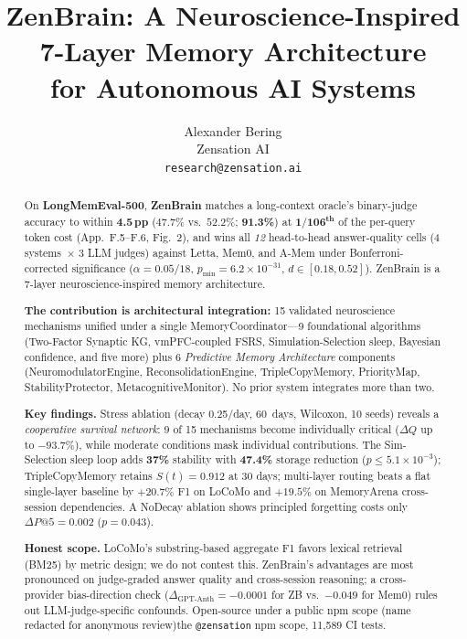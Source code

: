 \documentclass{article}
\title{ZenBrain: A Neuroscience-Inspired 7-Layer Memory Architecture\\for Autonomous AI Systems}
\author{
  Alexander Bering \\
  Zensation AI \\
  \texttt{research@zensation.ai} \\
}
\makeatletter
\newcommand{\anon}[2]{\if@anonymous #2\else #1\fi}
\makeatother
\begin{document}
\maketitle

\begin{abstract}
On \textbf{LongMemEval-500}, \textbf{ZenBrain} matches a long-context
oracle's binary-judge accuracy to within \textbf{4.5\,pp}
($47.7\%$ vs.\ $52.2\%$; \textbf{91.3\%}) at
$\mathbf{1/106^\text{th}}$ of the per-query token cost
(App.~F.5--F.6, Fig.~2), and wins all \emph{12} head-to-head
answer-quality cells (4 systems~$\times$ 3 LLM judges) against
Letta, Mem0, and A-Mem under
Bonferroni-corrected significance ($\alpha{=}0.05/18$,
$p_{\min}{=}6.2\times 10^{-31}$, $d \in [0.18, 0.52]$).
ZenBrain is a 7-layer neuroscience-inspired memory architecture.

\textbf{The contribution is architectural integration:}
15 validated neuroscience mechanisms unified under a single
MemoryCoordinator---9 foundational algorithms (Two-Factor Synaptic KG,
vmPFC-coupled FSRS, Simulation-Selection sleep, Bayesian confidence,
and five more) plus 6 \emph{Predictive Memory Architecture} components
(NeuromodulatorEngine, ReconsolidationEngine, TripleCopyMemory,
PriorityMap, StabilityProtector, MetacognitiveMonitor). No prior
system integrates more than two.

\textbf{Key findings.} Stress ablation (decay 0.25/day, 60~days,
Wilcoxon, 10 seeds) reveals a \emph{cooperative survival network}:
9 of 15 mechanisms become individually critical ($\Delta Q$ up to
$-93.7\%$), while moderate conditions mask individual contributions. The Sim-Selection sleep loop adds \textbf{37\%}
stability with \textbf{47.4\%} storage reduction ($p \le 5.1\times 10^{-3}$);
TripleCopyMemory retains $S(t){=}0.912$ at 30 days; multi-layer routing
beats a flat single-layer baseline by $+20.7\%$ F1 on LoCoMo
and $+19.5\%$ on MemoryArena cross-session dependencies. A NoDecay ablation shows principled forgetting costs
only $\Delta P@5{=}0.002$ ($p{=}0.043$).

\textbf{Honest scope.} LoCoMo's substring-based aggregate F1 favors
lexical retrieval (BM25) by metric design; we do not contest this.
ZenBrain's advantages are most pronounced on judge-graded answer
quality and cross-session reasoning; a cross-provider bias-direction
check ($\Delta_{\text{GPT-Anth}}{=}{-}0.0001$ for ZB vs.\ ${-}0.049$
for Mem0) rules out LLM-judge-specific confounds.
Open-source under \anon{the \texttt{@zensation} npm scope}{a public
npm scope (name redacted for anonymous review)}, 11{,}589 CI tests.
\end{abstract}
\end{document}
